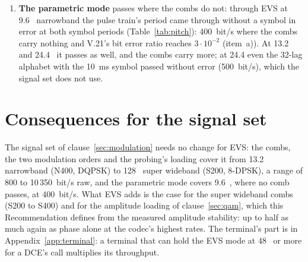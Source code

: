\begin{enumerate}[label=\alph*)]
  24.4~\kbs{} with the radio conditions, and a VoNR call may hold
  higher modes.  Between 13.2 and 24.4 the usable loading changes from
  one comb (N400, 800~bit/s) to another with 8-DPSK (N200, 2400~bit/s):
  the renegotiation of clause~\ref{sec:reneg} is what follows the
  codec, and the DCE should expect it every few seconds in a moving
  terminal.
\item \textbf{The parametric mode} passes where the combs do not: through
  EVS at 9.6~\kbs{} narrowband the pulse train's period came through
  without a symbol in error at both symbol periods
  (Table~\ref{tab:pitch}): 400~bit/s where the combs carry nothing and
  V.21's bit error ratio reaches $3 \cdot 10^{-2}$ (item~a)).  At 13.2
  and 24.4~\kbs{} it passes as well, and the combs carry more; at 24.4
  even the 32-lag alphabet with the 10~ms symbol passed without error
  (500~bit/s), which the signal set does not use.
\end{enumerate}

\section{Consequences for the signal set}
The signal set of clause~\ref{sec:modulation} needs no change for EVS:
the combs, the two modulation orders and the probing's loading cover it
from 13.2~\kbs{} narrowband (N400, DQPSK) to 128~\kbs{} super wideband
(S200, 8-DPSK), a range of 800 to 10\,350~bit/s raw, and the parametric
mode covers 9.6~\kbs{}, where no comb passes, at 400~bit/s.  What EVS adds is
the case for the super wideband combs (S200 to S400) and for the
amplitude loading of clause~\ref{sec:qam}, which this Recommendation
defines from the measured amplitude stability: up to half as much again
as phase alone at the codec's highest rates.  The terminal's
part is in Appendix~\ref{app:terminal}: a terminal that can hold the EVS
mode at 48~\kbs{} or more for a DCE's call multiplies its throughput.
